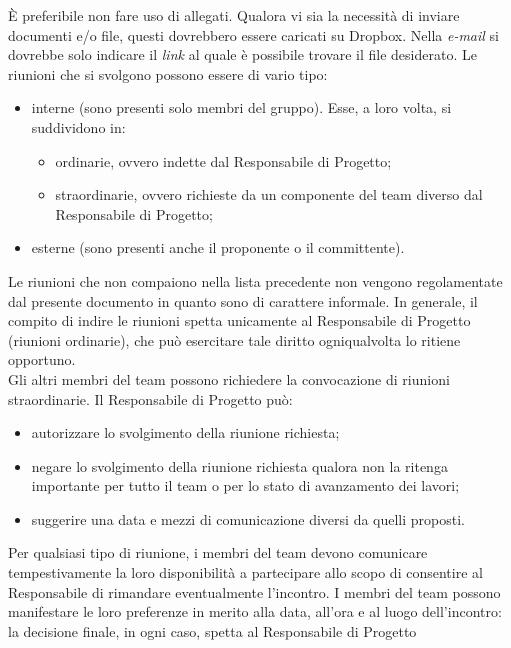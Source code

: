 					È preferibile non fare uso di allegati. Qualora vi sia la necessità di inviare documenti e/o file, questi dovrebbero essere caricati su Dropbox. Nella \textit{e-mail} si dovrebbe solo indicare il \textit{link} al quale è possibile trovare il file desiderato.
				Le riunioni che si svolgono possono essere di vario tipo:
				\begin{itemize}
					\item interne (sono presenti solo membri del gruppo). Esse, a loro volta, si suddividono in:
					\begin{itemize}
						\item ordinarie, ovvero indette dal Responsabile di Progetto;
						\item straordinarie, ovvero richieste da un componente del team diverso dal Responsabile di Progetto;
					\end{itemize}
					\item esterne (sono presenti anche il proponente o il committente).
				\end{itemize}
				Le riunioni che non compaiono nella lista precedente non vengono regolamentate dal presente documento in quanto sono di carattere informale.
					In generale, il compito di indire le riunioni spetta unicamente al Responsabile di Progetto (riunioni ordinarie), che può esercitare tale diritto ogniqualvolta lo ritiene opportuno.\\
					Gli altri membri del team possono richiedere la convocazione di riunioni straordinarie. Il Responsabile di Progetto può:
					\begin{itemize}
						\item autorizzare lo svolgimento della riunione richiesta;
						\item negare lo svolgimento della riunione richiesta qualora non la ritenga importante per tutto il team o per lo stato di avanzamento dei lavori;
						\item suggerire una data e mezzi di comunicazione diversi da quelli proposti.
					\end{itemize}
					Per qualsiasi tipo di riunione, i membri del team devono comunicare tempestivamente la loro disponibilità a partecipare allo scopo di consentire al Responsabile di rimandare eventualmente l'incontro. I membri del team possono manifestare le loro preferenze in merito alla data, all'ora e al luogo dell'incontro: la decisione finale, in ogni caso, spetta al Responsabile di Progetto\\
